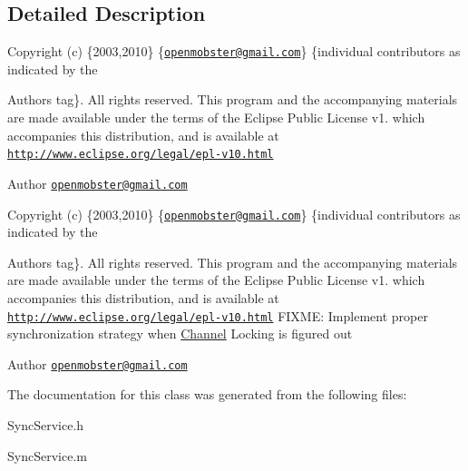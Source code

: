 \subsection{\-Detailed \-Description}
\-Copyright (c) \{2003,2010\} \{\href{mailto:openmobster@gmail.com}{\tt openmobster@gmail.\-com}\} \{individual contributors as indicated by the \begin{DoxyAuthor}{\-Authors}
tag\}. \-All rights reserved. \-This program and the accompanying materials are made available under the terms of the \-Eclipse \-Public \-License v1. which accompanies this distribution, and is available at \href{http://www.eclipse.org/legal/epl-v10.html}{\tt http\-://www.\-eclipse.\-org/legal/epl-\/v10.\-html}
\end{DoxyAuthor}
\begin{DoxyAuthor}{\-Author}
\href{mailto:openmobster@gmail.com}{\tt openmobster@gmail.\-com}
\end{DoxyAuthor}
\-Copyright (c) \{2003,2010\} \{\href{mailto:openmobster@gmail.com}{\tt openmobster@gmail.\-com}\} \{individual contributors as indicated by the \begin{DoxyAuthor}{\-Authors}
tag\}. \-All rights reserved. \-This program and the accompanying materials are made available under the terms of the \-Eclipse \-Public \-License v1. which accompanies this distribution, and is available at \href{http://www.eclipse.org/legal/epl-v10.html}{\tt http\-://www.\-eclipse.\-org/legal/epl-\/v10.\-html} \-F\-I\-X\-M\-E\-: \-Implement proper synchronization strategy when \hyperlink{interface_channel}{\-Channel} \-Locking is figured out
\end{DoxyAuthor}
\begin{DoxyAuthor}{\-Author}
\href{mailto:openmobster@gmail.com}{\tt openmobster@gmail.\-com} 
\end{DoxyAuthor}


\-The documentation for this class was generated from the following files\-:\begin{DoxyCompactItemize}
\item 
\-Sync\-Service.\-h\item 
\-Sync\-Service.\-m\end{DoxyCompactItemize}
